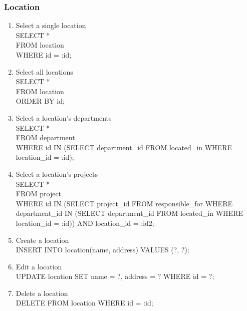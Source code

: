 \documentclass[11pt,letterpaper]{article}
\begin{document}
	\subsubsection{Location}
	\begin{enumerate}
		\item Select a single location \\SELECT * \\FROM location \\WHERE id = :id;
		\item Select all locations \\SELECT * \\FROM location \\ORDER BY id;
		\item Select a location's departments \\SELECT * \\FROM department \\WHERE id IN (SELECT department\_id FROM located\_in WHERE location\_id = :id);
		\item Select a location's projects \\SELECT * \\FROM project \\WHERE id IN (SELECT project\_id FROM responsible\_for WHERE department\_id IN (SELECT department\_id FROM located\_in WHERE location\_id = :id)) AND location\_id = :id2;
		\item Create a location \\INSERT INTO location(name, address) VALUES (?, ?); 
		\item Edit a location \\UPDATE location SET name = ?, address = ? WHERE id = ?;
		\item Delete a location \\DELETE FROM location WHERE id = :id;
	\end{enumerate}
\end{document}
